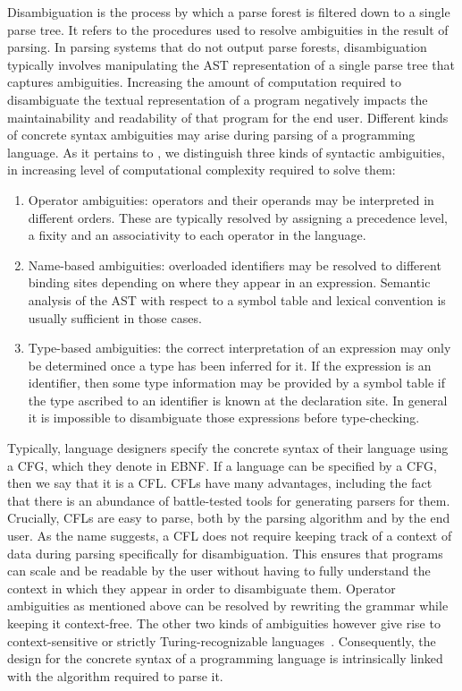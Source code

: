 Disambiguation is the process by which a parse forest is filtered down to a single parse tree.
It refers to the procedures used to resolve ambiguities in the result of parsing.
In parsing systems that do not output parse forests, disambiguation typically involves manipulating the \ac{AST} representation of a single parse tree that captures ambiguities.
Increasing the amount of computation required to disambiguate the textual representation of a program negatively impacts the maintainability and readability of that program for the end user.
Different kinds of concrete syntax ambiguities may arise during parsing of a programming language.
As it pertains to \Beluga, we distinguish three kinds of syntactic ambiguities, in increasing level of computational complexity required to solve them:
\begin{enumerate}
\item
Operator ambiguities: operators and their operands may be interpreted in different orders.
These are typically resolved by assigning a precedence level, a fixity and an associativity to each operator in the language.
\item
Name-based ambiguities: overloaded identifiers may be resolved to different binding sites depending on where they appear in an expression.
Semantic analysis of the \ac{AST} with respect to a symbol table and lexical convention is usually sufficient in those cases.
\item
Type-based ambiguities: the correct interpretation of an expression may only be determined once a type has been inferred for it.
If the expression is an identifier, then some type information may be provided by a symbol table if the type ascribed to an identifier is known at the declaration site.
In general it is impossible to disambiguate those expressions before type-checking.
\end{enumerate}



Typically, language designers specify the concrete syntax of their language using a \ac{CFG}, which they denote in \ac{EBNF}.
If a language can be specified by a \ac{CFG}, then we say that it is a \ac{CFL}.
\Acp{CFL} have many advantages, including the fact that there is an abundance of battle-tested tools for generating parsers for them.
Crucially, \acp{CFL} are easy to parse, both by the parsing algorithm and by the end user.
As the name suggests, a \ac{CFL} does not require keeping track of a context of data during parsing specifically for disambiguation.
This ensures that programs can scale and be readable by the user without having to fully understand the context in which they appear in order to disambiguate them.
Operator ambiguities as mentioned above can be resolved by rewriting the grammar while keeping it context-free.
The other two kinds of ambiguities however give rise to context-sensitive or strictly Turing-recognizable languages~\cite{chomsky1956three}.
Consequently, the design for the concrete syntax of a programming language is intrinsically linked with the algorithm required to parse it.

